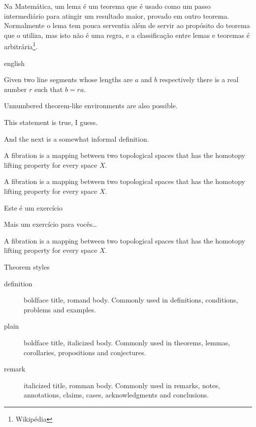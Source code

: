     Na Matemática, um lema é um teorema que é usado como um passo intermediário
    para atingir um resultado maior, provado em outro teorema. Normalmente o
    lema tem pouca serventia além de servir ao propósito do teorema que o
    utiliza, mas isto não é uma regra, e a classificação entre lemas e teoremas
    é arbitrária\footnote{Wikipédia}.

\begin{otherlanguage*}{english}

\begin{UFSClema}
    Given two line segments whose lengths are $a$ and $b$ respectively there is
    a real number $r$ such that $b=ra$. 
\end{UFSClema}

Unnumbered theorem-like environments are also possible.

\begin{UFSCobservacao}
    This statement is true, I guess. 
\end{UFSCobservacao}

And the next is a somewhat informal definition. 

\begin{UFSCdefinicao}[Fibration ]
    A fibration is a mapping between two topological spaces that has the
    homotopy lifting property for every space $X$. 
\end{UFSCdefinicao}

\begin{UFSCexemplo}[Fibration ]
    A fibration is a mapping between two topological spaces that has the
    homotopy lifting property for every space $X$. 
\end{UFSCexemplo}

\begin{UFSCexercicio}
    Este é um exercício 
\end{UFSCexercicio}

\begin{UFSCexercicio}
    Mais um exercício para vocês\ldots
\end{UFSCexercicio}

\begin{UFSCcondicao}[Fibration ]
    A fibration is a mapping between two topological spaces that has the
    homotopy lifting property for every space $X$. 
\end{UFSCcondicao}
Theorem styles

\begin{description}
    \item[definition] boldface title, romand body. Commonly used in definitions,
        conditions, problems and examples. 
\item[plain] boldface title, italicized body. Commonly used in theorems, lemmas,
    corollaries, propositions and conjectures.
\item[remark] italicized title, romman body. Commonly used in remarks, notes,
    annotations, claims, cases, acknowledgments and conclusions.
\end{description}

\end{otherlanguage*}

